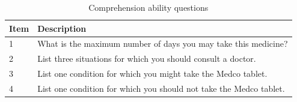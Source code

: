 \begin{table}[h!]
    \centering
    \caption{Comprehension ability questions}
    \label{tab:comprehension}
    \begin{tabular}{ll}
        \toprule
        Item & Description \\
        \midrule
        1 & What is the maximum number of days you may take this medicine? \\
        2 & List three situations for which you should consult a doctor. \\
        3 & List one condition for which you might take the Medco tablet. \\
        4 & List one condition for which you should not take the Medco tablet. \\
        \bottomrule
    \end{tabular}
\end{table}